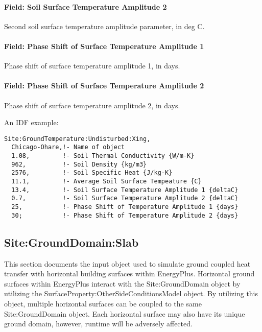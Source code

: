 \paragraph{Field: Soil Surface Temperature Amplitude 2}\label{field-soil-surface-temperature-amplitude-2}

Second soil surface temperature amplitude parameter, in deg C.

\paragraph{Field: Phase Shift of Surface Temperature Amplitude 1}\label{field-phase-shift-of-surface-temperature-amplitude-1}

Phase shift of surface temperature amplitude 1, in days.

\paragraph{Field: Phase Shift of Surface Temperature Amplitude 2}\label{field-phase-shift-of-surface-temperature-amplitude-2}

Phase shift of surface temperature amplitude 2, in days.

An IDF example:

\begin{lstlisting}
Site:GroundTemperature:Undisturbed:Xing,
  Chicago-Ohare,!- Name of object
  1.08,         !- Soil Thermal Conductivity {W/m-K}
  962,          !- Soil Density {kg/m3}
  2576,         !- Soil Specific Heat {J/kg-K}
  11.1,         !- Average Soil Surface Tempeature {C}
  13.4,         !- Soil Surface Temperature Amplitude 1 {deltaC}
  0.7,          !- Soil Surface Temperature Amplitude 2 {deltaC}
  25,           !- Phase Shift of Temperature Amplitude 1 {days}
  30;           !- Phase Shift of Temperature Amplitude 2 {days}
\end{lstlisting}

\subsection{Site:GroundDomain:Slab}\label{sitegrounddomainslab}

This section documents the input object used to simulate ground coupled heat transfer with horizontal building surfaces within EnergyPlus. Horizontal ground surfaces within EnergyPlus interact with the Site:GroundDomain object by utilizing the SurfaceProperty:OtherSideConditionsModel object. By utilizing this object, multiple horizontal surfaces can be coupled to the same Site:GroundDomain object. Each horizontal surface may also have its unique ground domain, however, runtime will be adversely affected.

